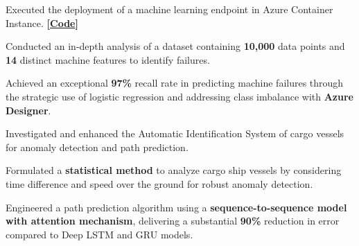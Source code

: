 \documentclass[]{deedy-resume-openfont}
\begin{document}
\begin{minipage}[t]{0.66\textwidth}
\item Executed the deployment of a machine learning endpoint in Azure Container Instance. \textbf{[\href{https://github.com/Shyam-Sundar-7/Machine-Failure-Prediction}{Code}]}

\begin{tightemize}
        \item Conducted an in-depth analysis of a dataset containing \textbf{10,000} data points and \textbf{14} distinct machine features to identify failures.
        \item Achieved an exceptional \textbf{{97\%}} recall rate in predicting machine failures through the strategic use of logistic regression and addressing class imbalance with \textbf{Azure Designer}.
\end{tightemize}
\sectionsep

\item Investigated and enhanced the Automatic Identification System of cargo vessels for anomaly detection and path prediction.
\begin{tightemize}
        \item Formulated a \textbf{statistical method} to analyze cargo ship vessels by considering time difference and speed over the ground for robust anomaly detection.
        \item Engineered a path prediction algorithm using a \textbf{sequence-to-sequence model with attention mechanism}, delivering a substantial \textbf{90\%} reduction in error compared to Deep LSTM and GRU models.
\end{tightemize}
\sectionsep










\end{minipage}
\end{document}
